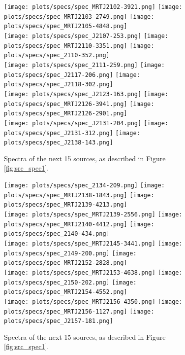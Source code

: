 \documentclass[preprint]{aastex}
\begin{document}
\begin{figure}\centering
\texttt{[image: plots/specs/spec\_MRTJ2102-3921.png]}
\texttt{[image: plots/specs/spec\_MRTJ2103-2749.png]}
\texttt{[image: plots/specs/spec\_MRTJ2105-4848.png]}\\
\texttt{[image: plots/specs/spec\_J2107-253.png]}
\texttt{[image: plots/specs/spec\_MRTJ2110-3351.png]}
\texttt{[image: plots/specs/spec\_2110-352.png]}\\
\texttt{[image: plots/specs/spec\_2111-259.png]}
\texttt{[image: plots/specs/spec\_J2117-206.png]}
\texttt{[image: plots/specs/spec\_J2118-302.png]}\\
\texttt{[image: plots/specs/spec\_J2123-163.png]}
\texttt{[image: plots/specs/spec\_MRTJ2126-3941.png]}
\texttt{[image: plots/specs/spec\_MRTJ2126-2901.png]}\\
\texttt{[image: plots/specs/spec\_J2131-204.png]}
\texttt{[image: plots/specs/spec\_J2131-312.png]}
\texttt{[image: plots/specs/spec\_J2138-143.png]}\\
\caption{Spectra of the next 15 sources, as described in Figure \ref{fig:src_spec1}.
}\label{fig:src_spec28}
\end{figure}\clearpage

\begin{figure}\centering
\texttt{[image: plots/specs/spec\_2134-209.png]}
\texttt{[image: plots/specs/spec\_MRTJ2138-1843.png]}
\texttt{[image: plots/specs/spec\_MRTJ2139-4213.png]}\\
\texttt{[image: plots/specs/spec\_MRTJ2139-2556.png]}
\texttt{[image: plots/specs/spec\_MRTJ2140-4412.png]}
\texttt{[image: plots/specs/spec\_2140-434.png]}\\
\texttt{[image: plots/specs/spec\_MRTJ2145-3441.png]}
\texttt{[image: plots/specs/spec\_2149-200.png]}
\texttt{[image: plots/specs/spec\_MRTJ2152-2828.png]}\\
\texttt{[image: plots/specs/spec\_MRTJ2153-4638.png]}
\texttt{[image: plots/specs/spec\_2150-202.png]}
\texttt{[image: plots/specs/spec\_MRTJ2154-4552.png]}\\
\texttt{[image: plots/specs/spec\_MRTJ2156-4350.png]}
\texttt{[image: plots/specs/spec\_MRTJ2156-1127.png]}
\texttt{[image: plots/specs/spec\_J2157-181.png]}\\
\caption{Spectra of the next 15 sources, as described in Figure \ref{fig:src_spec1}.
}\label{fig:src_spec29}
\end{figure}\clearpage
\end{document}
